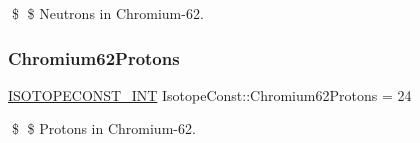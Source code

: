 \$ \$ Neutrons in Chromium-\/62. \mbox{\label{group___isotope_const-_chromium-_cr62_ga248dee1eafae7df72119c44dc2d0aaef}} 
\subsubsection{\texorpdfstring{Chromium62\+Protons}{Chromium62Protons}}
{\footnotesize\ttfamily \mbox{\hyperlink{group___isotope_const-_macros_ga5f18360b3e99483a35c32d789e62621c}{I\+S\+O\+T\+O\+P\+E\+C\+O\+N\+S\+T\+\_\+\+I\+NT}} Isotope\+Const\+::\+Chromium62\+Protons = 24}

\$ \$ Protons in Chromium-\/62. 